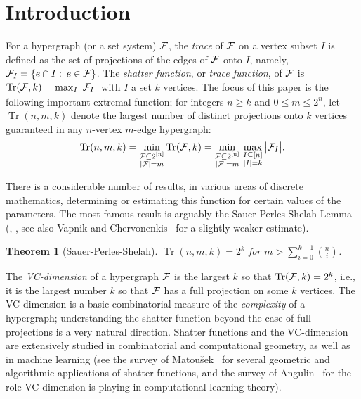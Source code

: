 \documentclass[11pt]{article}
\newtheorem{theo}{Theorem}[section]
\newcommand{\FF}{{\cal F}}
\newcommand{\sub}{\subseteq}
\DeclareMathOperator{\trace}{Tr}
\begin{document}
\section{Introduction}\label{se:intro}


For a hypergraph (or a set system) $\FF$, the \emph{trace} of $\FF$ on a vertex subset $I$ is defined as the set of projections of the edges of $\FF$ onto $I$, namely,
$\FF_I = \{e \cap I \,\colon\, e \in \FF \}$.
The \emph{shatter function}, or \emph{trace function}, of $\FF$ is 
$\trace(\FF,k) =\max_{I} \big|\FF_I\big|$ with $I$ a set $k$ vertices.
The focus of this paper is the following important extremal function; for integers $n \ge k$ and $0 \leq m \leq 2^n$, let $\trace(n,m,k)$ denote 
the largest number of distinct projections onto $k$ vertices guaranteed in any $n$-vertex $m$-edge hypergraph:
$$\trace(n,m,k) = \min_{\substack{\FF \sub 2^{[n]}\\|\FF|=m}} \trace(\FF,k) = \min_{\substack{\FF \sub 2^{[n]}\\|\FF|=m}} \, \max_{\substack{I \sub [n]\\|I|=k}} \big|\FF_I\big| .$$ 

There is a considerable number of results, in various areas of discrete mathematics, 
determining or estimating this function for certain values
of the parameters. The most famous result is arguably the Sauer-Perles-Shelah Lemma (\cite{Sa}, \cite{Sh}, see also
Vapnik and Chervonenkis~\cite{VC} for a slightly weaker estimate).
\begin {theo}[Sauer-Perles-Shelah]
\label{th:sps}
$\trace(n,m,k)=2^k$ for $m > \sum_{i=0}^{k-1} \binom{n}{i}$.
\end {theo}
The \emph{VC-dimension} of a hypergraph $\FF$ is the largest $k$ so that $\trace(\FF, k) = 2^k$, i.e., it is the largest number $k$ so that $\FF$ has a full projection on some $k$ vertices. The VC-dimension is a basic combinatorial measure of the \emph{complexity} of a hypergraph; understanding the shatter function beyond the case of full projections is a very natural direction. Shatter functions and the VC-dimension are extensively studied in combinatorial and computational geometry, as well as in machine learning (see the survey of Matou\v sek~\cite{Mat} for several geometric and algorithmic applications of shatter functions, and the survey of Angulin~\cite{An} for the role VC-dimension is playing in computational learning theory).
\end{document}
